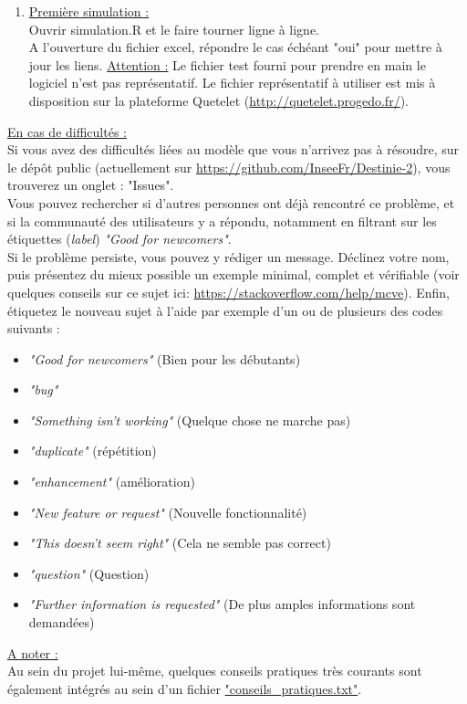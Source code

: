 \begin{enumerate}
\item \underline{Première simulation :}\\
Ouvrir simulation.R et le faire tourner ligne à ligne.\\
A l'ouverture du fichier excel, répondre le cas échéant "oui" pour mettre à jour les liens.
\underline{Attention :} Le fichier test fourni pour prendre en main le logiciel n'est pas représentatif. Le fichier représentatif à utiliser est mis à disposition sur la plateforme Quetelet (\url{http://quetelet.progedo.fr/}).\\


\end{enumerate}

\underline{En cas de difficultés :}\\
Si vous avez des difficultés liées au modèle que vous n'arrivez pas à résoudre, sur le dépôt public (actuellement sur \url{https://github.com/InseeFr/Destinie-2}), vous trouverez un onglet : "Issues".\\
Vous pouvez rechercher si d'autres personnes ont déjà rencontré ce problème, et si la communauté des utilisateurs y a répondu, notamment en filtrant sur les étiquettes (\textit{label}) \textit{"Good for newcomers"}.\\
Si le problème persiste, vous pouvez y rédiger un message. Déclinez votre nom, puis présentez du mieux possible un exemple minimal, complet et vérifiable (voir quelques conseils sur ce sujet ici: \url{https://stackoverflow.com/help/mcve}). Enfin, étiquetez le nouveau sujet à l'aide par exemple d'un ou de plusieurs des codes suivants :
\begin{itemize}
\item \textit{"Good for newcomers"} (Bien pour les débutants)
\item \textit{"bug"}
\item \textit{"Something isn't working"} (Quelque chose ne marche pas)
\item \textit{"duplicate"} (répétition)
\item \textit{"enhancement"} (amélioration)
\item \textit{"New feature or request"} (Nouvelle fonctionnalité)
\item \textit{"This doesn't seem right"} (Cela ne semble pas correct)
\item \textit{"question"} (Question)
\item \textit{"Further information is requested"} (De plus amples informations sont demandées)\\
\end{itemize}


\underline{A noter :}\\
Au sein du projet lui-même, quelques conseils pratiques très courants sont également intégrés au sein d'un fichier \url{"conseils_pratiques.txt"}.